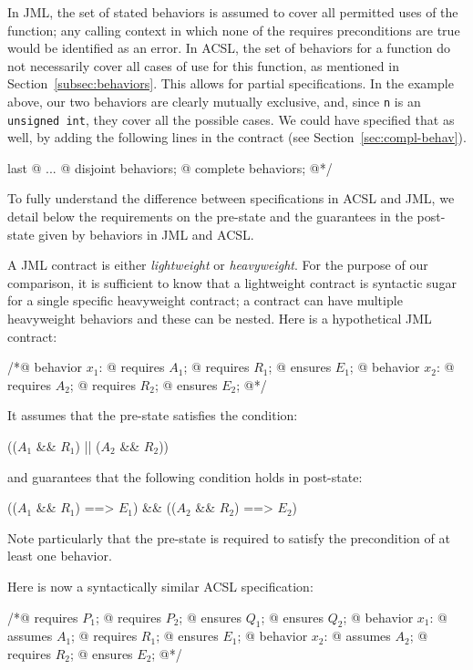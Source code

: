In JML, the set of stated behaviors is assumed to cover all
permitted uses of the function; any calling context in which none of the requires preconditions are true would be identified as an error.
In ACSL, the set of behaviors for a function do not
necessarily cover all cases of use for this function, as mentioned in
Section~\ref{subsec:behaviors}. This allows for partial
specifications. In the example above, our two behaviors are clearly mutually exclusive,
and, since \lstinline|n| is an \lstinline|unsigned int|, 
they cover all the possible cases. We could have specified that as well, by
adding the following lines in the contract (see
Section~\ref{sec:compl-behav}).
\begin{listing}{last}
  @ ...
  @ disjoint behaviors;
  @ complete behaviors;
  @*/
\end{listing}

To fully understand the difference between specifications in ACSL and
JML, we detail below the requirements on the pre-state and
the guarantees in the post-state given by behaviors in JML and ACSL.

A JML contract is either \emph{lightweight} or \emph{heavyweight}.
For the purpose of our comparison, it is sufficient to know that a
lightweight contract is syntactic sugar for a single specific 
heavyweight contract; a contract can have multiple heavyweight behaviors and these can be nested.
Here is a hypothetical JML contract:
\begin{listing}{1}
/*@ behavior $x_1$:
  @   requires $A_1$;
  @   requires $R_1$;
  @   ensures $E_1$;
  @ behavior $x_2$:
  @   requires $A_2$;
  @   requires $R_2$;
  @   ensures $E_2$;
  @*/
\end{listing}
It assumes that the pre-state satisfies the condition:
\begin{listing-nonumber}
(($A_1$ && $R_1$) || ($A_2$ && $R_2$))
\end{listing-nonumber}
and guarantees that the following condition holds in post-state:
\begin{listing-nonumber}
  (\old($A_1$ && $R_1$) ==> $E_1$) && (\old($A_2$ && $R_2$) ==> $E_2$)
\end{listing-nonumber}
Note particularly that the pre-state is required to satisfy
the precondition of at least one behavior.

Here is now a syntactically similar ACSL specification:

\begin{listing}{1}
/*@ requires $P_1$;
  @ requires $P_2$;
  @ ensures  $Q_1$;
  @ ensures  $Q_2$;
  @ behavior $x_1$:
  @   assumes $A_1$;
  @   requires $R_1$;
  @   ensures $E_1$;
  @ behavior $x_2$:
  @   assumes $A_2$;
  @   requires $R_2$;
  @   ensures $E_2$;
  @*/
\end{listing}

